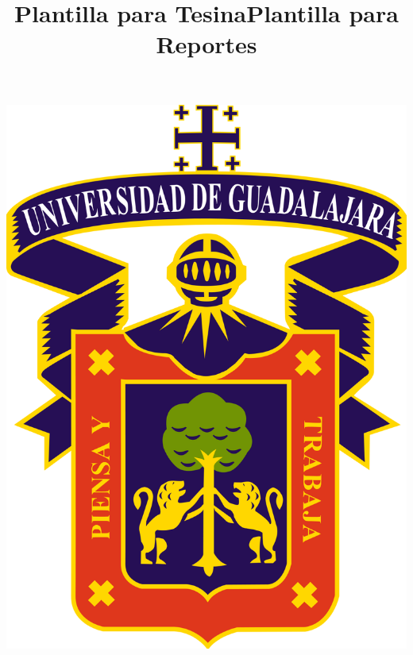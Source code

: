 \documentclass[12pt]{article}
\title{Plantilla para Tesina}
\title{Plantilla para Reportes}
\begin{document}
\begin{center}																		%
\newcommand{\HRule}{\rule{\linewidth}{0.5mm}}									%
\begin{minipage}{0.48\textwidth} \begin{flushleft}
\includegraphics[scale = 0.05]{Imagenes/Escudo_UdeG.png}
\end{flushleft}\end{minipage}
\begin{minipage}{0.48\textwidth} \begin{flushright}

\end{flushright}
\end{minipage}
\end{center}
\end{document}
